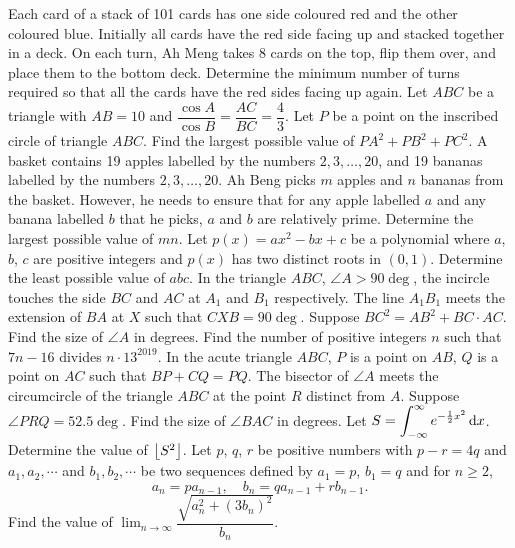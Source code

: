 \begin{enumerate}
    \hyperrefitem[A::2021-O-1-17] Each card of a stack of 101 cards has one side coloured red and the other coloured blue. Initially all cards have the red side facing up and stacked together in a deck. On each turn, Ah Meng takes 8 cards on the top, flip them over, and place them to the bottom deck. Determine the minimum number of turns required so that all the cards have the red sides facing up again.
    \hyperrefitem[A::2021-O-1-18] Let $ABC$ be a triangle with $AB = 10$ and $\dfrac{\cos A}{\cos B} = \dfrac{AC}{BC} = \dfrac43$. Let $P$ be a point on the inscribed circle of triangle $ABC$. Find the largest possible value of $PA^2 + PB^2 + PC^2$.
    \hyperrefitem[A::2021-O-1-19] A basket contains 19 apples labelled by the numbers $2, 3, \ldots, 20$, and 19 bananas labelled by the numbers $2, 3, \ldots, 20$. Ah Beng picks $m$ apples and $n$ bananas from the basket. However, he needs to ensure that for any apple labelled $a$ and any banana labelled $b$ that he picks, $a$ and $b$ are relatively prime. Determine the largest possible value of $mn$.
    \hyperrefitem[A::2021-O-1-20] Let $p(x) = ax^2 - bx + c$ be a polynomial where $a$, $b$, $c$ are positive integers and $p(x)$ has two distinct roots in $(0, 1)$. Determine the least possible value of $abc$.
    \hyperrefitem[A::2021-O-1-21] In the triangle $ABC$, $\angle A > 90\deg$, the incircle touches the side $BC$ and $AC$ at $A_1$ and $B_1$ respectively. The line $A_1 B_1$ meets the extension of $BA$ at $X$ such that $CXB = 90\deg$. Suppose $BC^2 = AB^2 + BC \cdot AC$. Find the size of $\angle A$ in degrees.
    \hyperrefitem[A::2021-O-1-22] Find the number of positive integers $n$ such that $7n-16$ divides $n \cdot 13^{2019}$.
    \hyperrefitem[A::2021-O-1-23] In the acute triangle $ABC$, $P$ is a point on $AB$, $Q$ is a point on $AC$ such that $BP + CQ = PQ$. The bisector of $\angle A$ meets the circumcircle of the triangle $ABC$ at the point $R$ distinct from $A$. Suppose $\angle PRQ = 52.5\deg$. Find the size of $\angle BAC$ in degrees.
    \hyperrefitem[A::2021-O-1-24] Let $S = \displaystyle\int_{-\infty}^\infty e^{-\frac12 x^2} \mathop{\mathrm{d}x}$. Determine the value of $\left\lfloor S^2 \right\rfloor$.
    \hyperrefitem[A::2021-O-1-25] Let $p$, $q$, $r$ be positive numbers with $p-r= 4q$ and $a_1, a_2, \cdots$ and $b_1, b_2, \cdots$ be two sequences defined by $a_1 = p$, $b_1 = q$ and for $n \geq 2$, \[a_n = pa_{n-1}, \quad b_n = qa_{n-1} + rb_{n-1}.\] Find the value of $\displaystyle\lim_{n \to \infty} \dfrac{\sqrt{a_n^2 + (3b_n)^2}}{b_n}$.
\end{enumerate}
